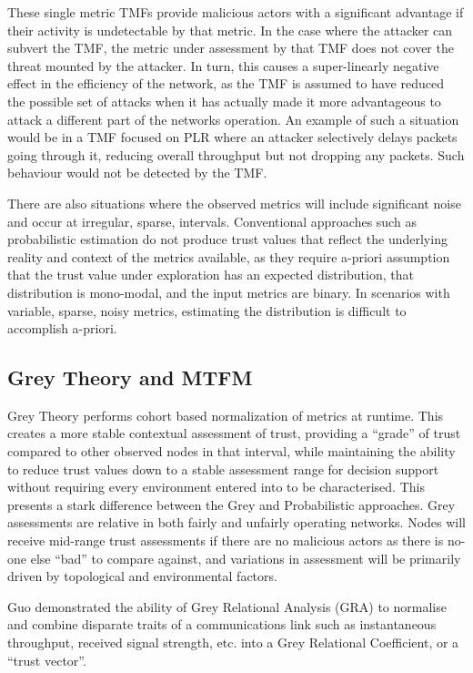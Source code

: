 \documentclass[conference]{IEEEtran}
\begin{document}
These single metric TMFs provide malicious actors with a significant advantage if their activity is undetectable by that metric.
In the case where the attacker can subvert the TMF, the metric under assessment by that TMF does not cover the threat mounted by the attacker.
In turn, this causes a super-linearly negative effect in the efficiency of the network, as the TMF is assumed to have reduced the possible set of attacks when it has actually made it more advantageous to attack a different part of the networks operation.
An example of such a situation would be in a TMF focused on PLR where an attacker selectively delays packets going through it, reducing overall throughput but not dropping any packets.
Such behaviour would not be detected by the TMF.

There are also situations where the observed metrics will include significant noise and occur at irregular, sparse, intervals.
Conventional approaches such as probabilistic estimation do not produce trust values that reflect the underlying reality and context of the metrics available, as they require a-priori assumption that the trust value under exploration has an expected distribution, that distribution is mono-modal, and the input metrics are binary.
In scenarios with variable, sparse, noisy metrics, estimating the distribution is difficult to accomplish a-priori.

\subsection{Grey Theory and MTFM}

Grey Theory performs cohort based normalization of metrics at runtime. 
This creates a more stable contextual assessment of trust, providing a ``grade'' of trust compared to other observed nodes in that interval, while maintaining the ability to reduce trust values down to a stable assessment range for decision support without requiring every environment entered into to be characterised.
This presents a stark difference between the Grey and Probabilistic approaches.
Grey assessments are relative in both fairly and unfairly operating networks.
Nodes will receive mid-range trust assessments if there are no malicious actors as there is no-one else ``bad'' to compare against, and variations in assessment will be primarily driven by topological and environmental factors.

Guo\cite{Guo11} demonstrated the ability of Grey Relational Analysis (GRA)\cite{Zuo1995} to normalise and combine disparate traits of a communications link such as instantaneous throughput, received signal strength, etc. into a Grey Relational Coefficient, or a ``trust vector''.
\end{document}
